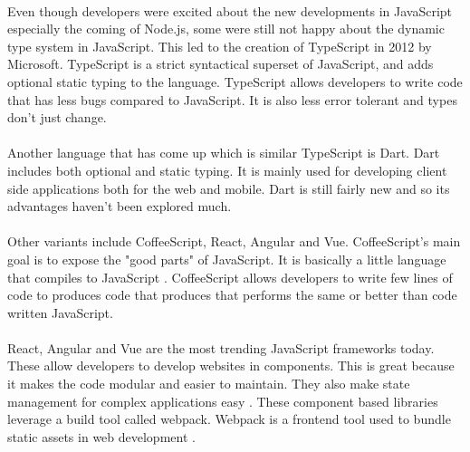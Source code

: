\paragraph{}
Even though developers were excited about the new developments in JavaScript especially the coming of Node.js, some were still not happy about the dynamic type system in JavaScript. This led to the creation of TypeScript in 2012 by Microsoft. TypeScript is a strict syntactical superset of JavaScript, and adds optional static typing to the language. TypeScript allows developers to write code that has less bugs compared to JavaScript. It is also less error tolerant and types don't just change.
\paragraph{}
Another language that has come up which is similar TypeScript is Dart. Dart includes both optional and static typing. It is mainly used for developing client side applications both for the web and mobile. Dart is still fairly new and so its advantages haven't been explored much.
\paragraph{}
Other variants include CoffeeScript, React, Angular and Vue. CoffeeScript's main goal is to expose the "good parts" of JavaScript. It is basically a little language that compiles to JavaScript \cite{coffee}. CoffeeScript allows developers to write few lines of code to produces code that produces that performs the same or better than code written JavaScript.
\paragraph{}
React, Angular and Vue are the most trending JavaScript frameworks today. These allow developers to develop websites in components. This is great because it makes the code modular and easier to maintain. They also make state management for complex applications easy \cite{react}. These component based libraries leverage a build tool called webpack. Webpack is a frontend tool used to bundle static assets in web development \cite{webpack}.
